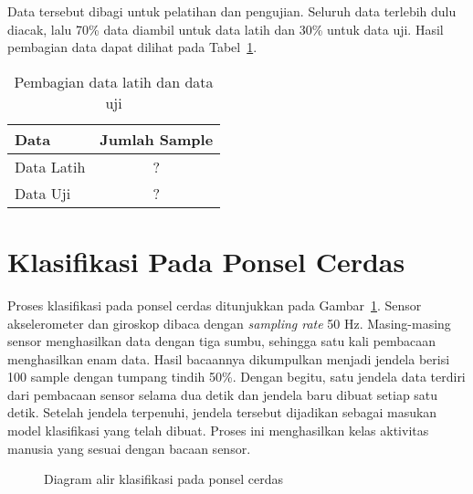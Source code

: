 Data tersebut dibagi untuk pelatihan dan pengujian. Seluruh data terlebih dulu diacak, lalu 70\% data diambil untuk data latih dan 30\% untuk data uji. Hasil pembagian data dapat dilihat pada Tabel~\ref{table:pembagian-data-latih-uji}.

\begin{table}[h!]
    \centering
    \caption{Pembagian data latih dan data uji}
    \begin{tabular}{ |l|c| }
        \hline
        \textbf{Data} & \textbf{Jumlah Sample} \\

        \hline
        Data Latih & ? \\

        \hline
        Data Uji & ? \\

        \hline
    \end{tabular}
    \label{table:pembagian-data-latih-uji}
\end{table}


\section{Klasifikasi Pada Ponsel Cerdas}
Proses klasifikasi pada ponsel cerdas ditunjukkan pada Gambar~\ref{gambar:diagram-alir-klasifikasi-ponsel-cerdas}. Sensor akselerometer dan giroskop dibaca dengan \textit{sampling rate} 50 Hz. Masing-masing sensor menghasilkan data dengan tiga sumbu, sehingga satu kali pembacaan menghasilkan enam data. Hasil bacaannya dikumpulkan menjadi jendela berisi 100 sample dengan tumpang tindih 50\%. Dengan begitu, satu jendela data terdiri dari pembacaan sensor selama dua detik dan jendela baru dibuat setiap satu detik. Setelah jendela terpenuhi, jendela tersebut dijadikan sebagai masukan model klasifikasi yang telah dibuat. Proses ini menghasilkan kelas aktivitas manusia yang sesuai dengan bacaan sensor.

\begin{figure}[h]
    \centering
    \caption{Diagram alir klasifikasi pada ponsel cerdas}
    \label{gambar:diagram-alir-klasifikasi-ponsel-cerdas}
\end{figure}


